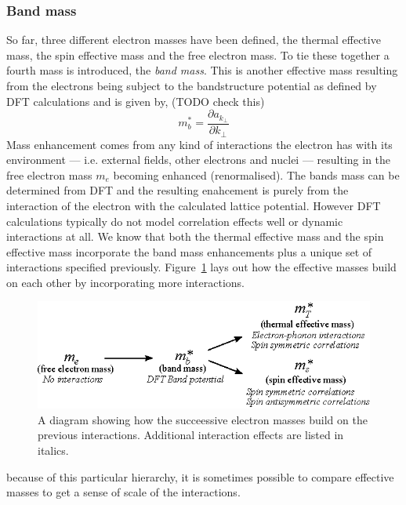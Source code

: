 \subsubsection{Band mass}

So far, three different electron masses have been defined, the thermal effective mass, the spin effective mass and the free electron mass. To tie these together a fourth mass is introduced, the \textit{band mass}. This is another effective mass resulting from the electrons being subject to the bandstructure potential as defined by \ac{DFT} calculations and is given by,
(TODO check this)
\begin{equation}
  m^*_b = \frac{\partial a_{k_\perp}}{\partial k_\perp}
\end{equation}
Mass enhancement comes from any kind of interactions the electron has with its environment --- i.e. external fields, other electrons and nuclei --- resulting in the free electron mass $m_e$ becoming enhanced (renormalised). The bands mass can be determined from \ac{DFT} and the resulting enahcement is purely from the interaction of the electron with the calculated lattice potential. However \ac{DFT} calculations typically do not model correlation effects well or dynamic interactions at all. We know that both the thermal effective mass and the spin effective mass incorporate the band mass enhancements plus a unique set of interactions specified previously. Figure~\ref{Fig:2:EffectiveMassInheritance} lays out how the effective masses build on each other by incorporating more interactions.
\begin{figure}[htbp]
    \begin{center}
        \includegraphics[scale=0.9]{Chapter2-ExperimentalTechnique/Figures/EffectiveMassInheritance/EffectiveMassInheritance}
        \caption{A diagram showing how the succeessive electron masses build on the previous interactions. Additional interaction effects are listed in italics.}
        \label{Fig:2:EffectiveMassInheritance}
    \end{center}
\end{figure}
because of this particular hierarchy, it is sometimes possible to compare effective masses to get a sense of scale of the interactions.

